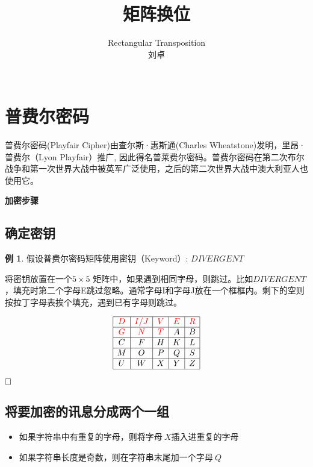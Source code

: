 \documentclass{article}
\date{}
\title{矩阵换位}
\author{
Rectangular Transposition\\
 刘卓\\
 \texttt{ } \\
}
\theoremstyle{definition}
\newtheorem{example}{\indent 例}
\begin{document}
\maketitle

\section{普费尔密码}

普费尔密码(Playfair Cipher)由查尔斯·惠斯通(Charles Wheatstone)发明，里昂·普费尔（Lyon Playfair）推广, 因此得名普莱费尔密码。普费尔密码在第二次布尔战争和第一次世界大战中被英军广泛使用，之后的第二次世界大战中澳大利亚人也使用它。


\textbf{加密步骤}

\subsection{确定密钥}


\begin{example}


假设普费尔密码矩阵使用密钥（Keyword）: $DIVERGENT$

将密钥放置在一个$5 \times 5$ 矩阵中，如果遇到相同字母，则跳过。比如$DIVERGENT$，填充时第二个字母{\color{red}E}跳过忽略。通常字母{\color{red}I}和字母{\color{red}J}放在一个框框内。剩下的空则按拉丁字母表挨个填充，遇到已有字母则跳过。

$$
\begin{array}{|c|c|c|c|c|}
\hline {\color{red}D} &  {\color{red}I / J} &  {\color{red}V} &  {\color{red}E} &  {\color{red}R} \\
\hline  {\color{red}G} &  {\color{red}N} &  {\color{red}T} & A & B \\
\hline C & F & H & K & L \\
\hline M & O & P & Q & S \\
\hline U & W & X & Y & Z \\
\hline
\end{array}
$$ 

\end{example}
$\hfill\square$ 

\subsection{将要加密的讯息分成两个一组}

\begin{itemize}
\item 如果字符串中有重复的字母，则将字母$\ X $插入进重复的字母
\item 如果字符串长度是奇数，则在字符串末尾加一个字母$\ Q $
\end{itemize}
\end{document}
